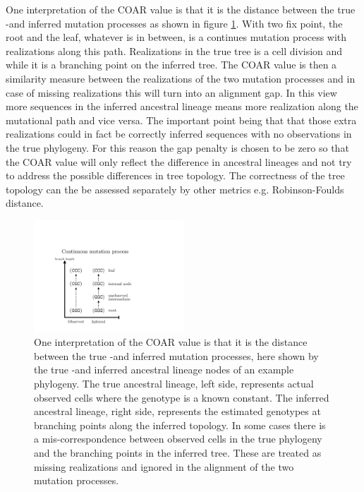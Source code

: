 One interpretation of the COAR value is that it is the distance between the true -and inferred mutation processes as shown in figure \ref{fig:mutation_process}.
With two fix point, the root and the leaf, whatever is in between, is a continues mutation process with realizations along this path.
Realizations in the true tree is a cell division and while it is a branching point on the inferred tree.
The COAR value is then a similarity measure between the realizations of the two mutation processes and in case of missing realizations this will turn into an alignment gap.
In this view more sequences in the inferred ancestral lineage means more realization along the mutational path and vice versa.
The important point being that that those extra realizations could in fact be correctly inferred sequences with no observations in the true phylogeny.
For this reason the gap penalty is chosen to be zero so that the COAR value will only reflect the difference in ancestral lineages and not try to address the possible differences in tree topology. 
The correctness of the tree topology can the be assessed separately by other metrics e.g. Robinson-Foulds distance.
\begin{figure}[ht!]
    \centering
    \includegraphics[width=0.5\textwidth]{figures/mutation_process2.pdf}
    \caption{
        \label{fig:mutation_process}
        One interpretation of the COAR value is that it is the distance between the true -and inferred mutation processes, here shown by the true -and inferred ancestral lineage nodes of an example phylogeny. The true ancestral lineage, left side, represents actual observed cells where the genotype is a known constant. The inferred ancestral lineage, right side, represents the estimated genotypes at branching points along the inferred topology. In some cases there is a mis-correspondence between observed cells in the true phylogeny and the branching points in the inferred tree. These are treated as missing realizations and ignored in the alignment of the two mutation processes.
    }
\end{figure}





